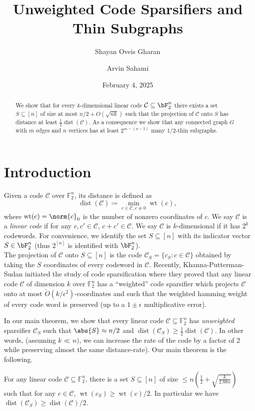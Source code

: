 \documentclass[12pt]{article}
\title{Unweighted Code Sparsifiers and Thin Subgraphs}
\author[1]{Shayan Oveis Gharan}
\affil{\small University of Washington, \textsf{shayan@cs.washington.edu}}
\author[2]{Arvin Sahami}
\affil{\small University of British Columbia, \textsf{arvin52@student.ubc.ca}}
\date{February 4, 2025}
\def\C{\mathcal{C}}
\DeclareMathOperator{\wt}{wt}
\DeclareMathOperator{\dist}{dist}
\def\eps{\epsilon}
\newcommand{\cd}{k} %
\begin{document}
\maketitle
\begin{abstract}
    We show that for every $\cd$-dimensional linear code $\C \subseteq \bF_2^n$ there exists a set $S\subseteq [n]$ of size at most $n/2+O(\sqrt{n\cd})$ such that the projection of $\C$ onto $S$ has distance at least $\frac12\dist(\C)$.
    As a consequence we show that any connected graph $G$ with $m$ edges and $n$ vertices has at least $2^{m-(n-1)}$ many $1/2$-thin subgraphs.
\end{abstract}

\section{Introduction}
Given a code $\C$ over $\mathbb{F}_2^n$, its distance is defined as
$$ \dist(\C) \coloneq \min_{c\in \C, c\neq 0} \wt(c),$$
where $\wt(c) = \norm{c}_0$ is the number of nonzero coordinates of $c$.
We say $\C$ is a {\em linear code} if for any $c,c'\in \C$, $c+c'\in \C$.
We say $\C$ is $\cd$-dimensional if it has $2^\cd$ codewords.
For convenience, we identify the set $S\subseteq [n]$ with its indicator vector $S \in \bF_2^n$ (thus $2^{[n]}$ is identified with $\bF_2^n$). 
\\

The projection of $\C$ onto $S\subseteq [n]$ is the code $\C_S=\{c_S: c\in \C\}$ obtained by taking the $S$ coordinates of every codeword in $\C$. Recently, Khanna-Putterman-Sudan \cite{KPS24}  initiated the study of code sparsification where they proved that any linear code $\C$ of dimension $\cd$ over $\mathbb{F}_2^n$ has a ``weighted'' code sparsifier which projects $\C$ onto at most $\widetilde{O}(\cd/\eps^2)$-coordinates and such that the weighted hamming weight of every code word is preserved (up to a $1\pm\eps$ multiplicative error). 

In our main theorem, we show that every linear code $\C\subseteq \mathbb{F}_2^n$ has {\em unweighted} sparsifier $\C_S$ such that $\abs{S}\approx n/2$ and $\dist(\C_S)\geq \frac12 \dist(\C)$. In other words, (assuming $\cd\ll n)$, we can increase the rate of the code by a factor of 2 while preserving almost the same distance-rate).
Our main theorem is the following.
\begin{thm}\label{thm:main}
    For any linear code $\C\subseteq \mathbb{F}_2^n$, there is a set $S\subseteq [n]$ of size $\leq n(\frac12 +\sqrt{\frac \cd {2.88n}})$ such that for any $c\in \C$, $\wt(c_S)\geq \wt(c)/2$. In particular we have $\dist(\C_S) \geq \dist(\C)/2$.
\end{thm}
\end{document}
